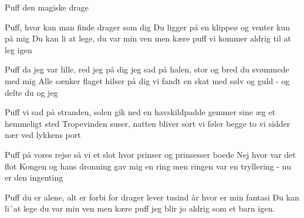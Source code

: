 \begin{sang}{Puff den magiske drage}{}
\begin{vers}
Puff, hvor kan man finde drager som dig
Du ligger på en klippeø
og venter kun på mig
Du kan li at lege, du var min ven
men kære puff vi kommer aldrig til at leg igen
\begin{vers}
\end{vers}
Puff da jeg var lille, red jeg på dig
jeg sad på halen, stor og bred
du svømmede med mig
Alle sænker flaget hilser på dig
vi fandt en skat med sølv og guld - og delte du og jeg
\begin{vers}
\end{vers}
Puff vi sad på stranden, solen gik ned
en havskildpadde gemmer sine æg et hemmeligt sted
Tropevinden suser, natten bliver sort
vi føler begge to vi sidder nær ved lykkens port
\begin{vers}
\end{vers}
Puff på vores rejse så vi et slot
hvor prinser og prinsesser boede
Nej hvor var det flot
Kongen og hans dronning gav mig en ring
men ringen var en tryllering - nu er den ingenting
\begin{vers}
\end{vers}
Puff du er alene, alt er forbi
for drager lever tusind år
hvor er min fantasi
Du kan li´at lege du var min ven
men kære puff jeg blir jo aldrig som et barn igen.
\end{vers}
\end{sang}
